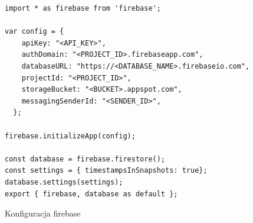 \begin{listing}
	\begin{verbatim}
import * as firebase from 'firebase';

var config = {
    apiKey: "<API_KEY>",
    authDomain: "<PROJECT_ID>.firebaseapp.com",
    databaseURL: "https://<DATABASE_NAME>.firebaseio.com",
    projectId: "<PROJECT_ID>",
    storageBucket: "<BUCKET>.appspot.com",
    messagingSenderId: "<SENDER_ID>",
  };

firebase.initializeApp(config);

const database = firebase.firestore();
const settings = { timestampsInSnapshots: true};
database.settings(settings);
export { firebase, database as default };
	\end{verbatim}
	\caption{Konfiguracja firebase} \label{listing:firebaseConfig}
\end{listing}